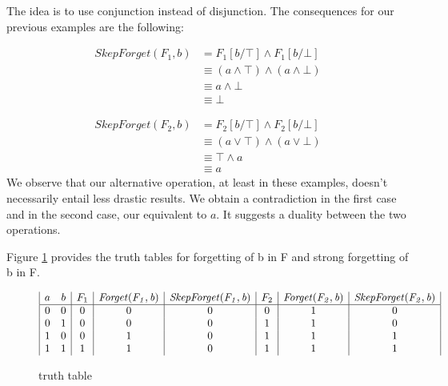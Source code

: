 \documentclass[f,proposal,palatino]{AIGpaper}
\begin{document}
The idea is to use conjunction instead of disjunction. The consequences for our previous examples are the following:

    \begin{align*}
    \mathit{SkepForget(F_1,b)} &= F_1[b/\top] \land F_1[b/\bot] \\ 
    &\equiv (a \land \top) \land (a \land \bot) \\ 
    &\equiv a \land \bot \\ 
    &\equiv \bot
    \end{align*}
    
    \begin{align*}
        \mathit{SkepForget(F_2,b)} &= F_2[b/\top] \land F_2[b/\bot] \\ 
        &\equiv (a \lor \top) \land (a \lor \bot) \\ 
        &\equiv \top \land a \\ 
        &\equiv a 
    \end{align*}
We observe that our alternative operation, at least in these examples, doesn't necessarily entail less drastic results. We obtain a contradiction in the first case and in the second case, our equivalent to $a$. It suggests a duality between the two operations.

Figure \ref{fig:tt1} provides the truth tables for forgetting of b in F and strong forgetting of b in F.
\begin{figure}[ht]
    \centering
       \begin{displaymath}
            \begin{array}{|c c|c|c|c|c|c|c|}
            a & b & F_1 & \mathit{Forget(F_1,b)} & \mathit{SkepForget(F_1,b)} & F_2 & \mathit{Forget(F_2,b)} & \mathit{SkepForget(F_2,b)}\\ 
            \hline
            0 & 0 & 0 & 0 & 0 & 0 & 1 & 0\\
            0 & 1 & 0 & 0 & 0 & 1 & 1 & 0\\
            1 & 0 & 0 & 1 & 0 & 1 & 1 & 1\\
            1 & 1 & 1 & 1 & 0 & 1 & 1 & 1\\
            \end{array}
       \end{displaymath}
    \caption{truth table}
    \label{fig:tt1}
\end{figure}
\end{document}

